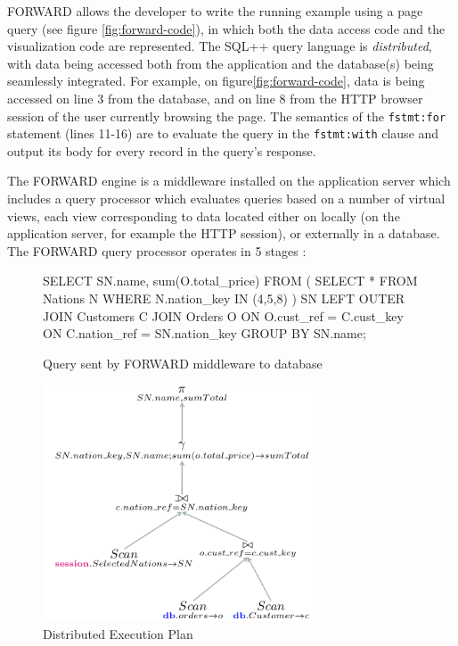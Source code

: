 FORWARD allows the developer to write the running example using a page query (see figure \ref{fig:forward-code}), in which both the data access code and the visualization code are represented. The SQL++ query language is \emph{distributed}, with data being accessed both from the application and the database(s) being seamlessly integrated.  For example, on figure\ref{fig:forward-code}, data is being accessed on line 3 from the database, and on line 8 from the HTTP browser session of the user currently browsing the page. The semantics of the \texttt{fstmt:for} statement (lines 11-16) are to evaluate the query in the \texttt{fstmt:with} clause and output its body for every record in the query's response.

The FORWARD engine is a middleware installed on the application server which includes a query processor which evaluates queries based on a number of virtual views, each view corresponding to data located either on locally (on the application server, for example the HTTP session), or externally in a database. The FORWARD query processor operates in 5 stages :

\begin{figure}[h]
\centering
\begin{minipage}{0.45\textwidth}
\centering
\begin{SQL}[basicstyle=\small, language=HTML]
SELECT SN.name, sum(O.total_price)
FROM (
  SELECT *
  FROM Nations N
  WHERE N.nation_key IN (4,5,8)
) SN
LEFT OUTER JOIN Customers C
JOIN Orders O 
ON O.cust_ref = C.cust_key
ON C.nation_ref = SN.nation_key
GROUP BY SN.name;
\end{SQL}
\caption{Query sent by FORWARD middleware to database}
\label{fig:forward-query}
\end{minipage} \hfill
\begin{minipage}{0.45\textwidth}
\centering
\includegraphics[width=8cm]{images/distributed-plan}
\caption{Distributed Execution Plan}
\label{fig:distributed}
\end{minipage} \hfill
\end{figure}

